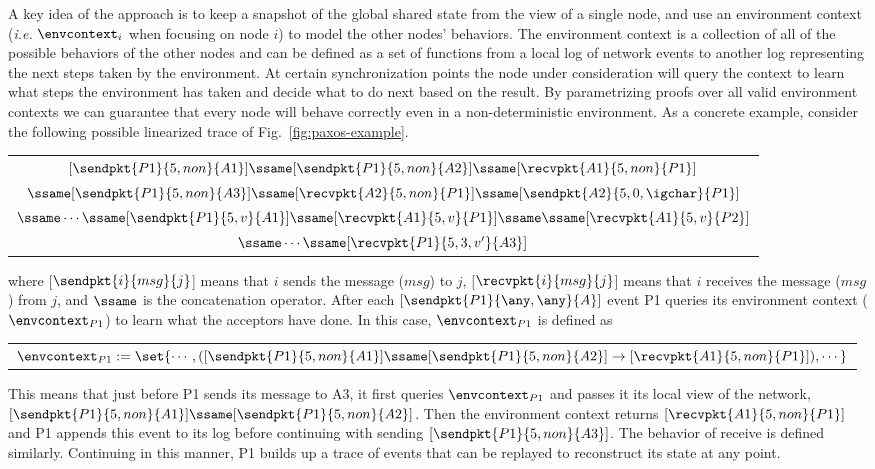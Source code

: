 A key idea of the approach is to keep a snapshot of the global shared state from the view of a single node,
and use an environment context (\textit{i.e.} $\envcontext_i$ when focusing on node $i$) to model the
other nodes' behaviors.
The environment context is a collection of all of the possible behaviors of the other nodes and
can be defined as a set of functions from a local log of network events to another log representing the next steps taken by the environment.
At certain synchronization points the node under consideration will query the context to learn what steps
the environment has taken and decide what to do next based on the result.
By parametrizing proofs over all valid environment contexts we can guarantee that every node will behave correctly
even in a non-deterministic environment.
As a concrete example, consider the following possible linearized trace of Fig.~\ref{fig:paxos-example}.
\begin{center}
\begin{tabular}{c}
$[\sendpkt{P1}{5, non}{A1}] \ssame [\sendpkt{P1}{5, non}{A2}]  \ssame [\recvpkt{A1}{5, non}{P1}]$\\
$\ssame [\sendpkt{P1}{5, non}{A3}]  \ssame [\recvpkt{A2}{5, non}{P1}]    \ssame [\sendpkt{A2}{5, 0, \igchar}{P1}]$\\
$ \ssame \cdots \ssame [\sendpkt{P1}{5, v}{A1}] \ssame 
[\recvpkt{A1}{5, v}{P1}] \ssame \ssame [\recvpkt{A1}{5, v}{P2}]$\\
$ \ssame \cdots \ssame [\recvpkt{P1}{5, 3, v'}{A3}] $\\ 
\end{tabular}
\end{center}
where [$\sendpkt{i}{msg}{j}$] means that $i$ sends the message ($msg$) to $j$,
[$\recvpkt{i}{msg}{j}$] means that $i$ receives the message ($msg$) from $j$,
and $\ssame$ is the concatenation operator.
After each $[\sendpkt{P1}{\any, \any}{A}]$ event P1 queries its environment context ($\envcontext_{P1}$) to learn what the acceptors have done.
In this case, $\envcontext_{P1}$ is defined as
\begin{center}
\begin{tabular}{c}
$\envcontext_{P1} := \set{\cdots, ([\sendpkt{P1}{5, non}{A1}] \ssame [\sendpkt{P1}{5, non}{A2}]   \rightarrow [\recvpkt{A1}{5, non}{P1}]), \cdots}$\\
\end{tabular}
\end{center}
This means that just before P1 sends its message to A3, it first
queries $\envcontext_{P1}$ and passes it its local view of the network,
$[\sendpkt{P1}{5, non}{A1}] \ssame [\sendpkt{P1}{5, non}{A2}]$. 
Then the environment context returns $[\recvpkt{A1}{5, non}{P1}]$ and P1 appends this event to its log before continuing
with sending $[\sendpkt{P1}{5, non}{A3}]$.
The behavior of receive is defined similarly.
Continuing in this manner, P1 builds up a trace of events that can be replayed to reconstruct its
state at any point.

